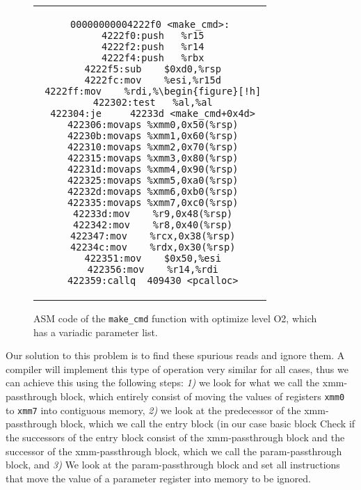 \begin{figure}[thp] %
\centering          %
\begin{tabular}{c}  %
\footnotesize
\begin{lstlisting}
00000000004222f0 <make_cmd>:
 4222f0:push   %r15
 4222f2:push   %r14
 4222f4:push   %rbx
 4222f5:sub    $0xd0,%rsp
 4222fc:mov    %esi,%r15d
 4222ff:mov    %rdi,%\begin{figure}[!h]
 422302:test   %al,%al
 422304:je     42233d <make_cmd+0x4d>
 422306:movaps %xmm0,0x50(%rsp)
 42230b:movaps %xmm1,0x60(%rsp)
 422310:movaps %xmm2,0x70(%rsp)
 422315:movaps %xmm3,0x80(%rsp)
 42231d:movaps %xmm4,0x90(%rsp)
 422325:movaps %xmm5,0xa0(%rsp)
 42232d:movaps %xmm6,0xb0(%rsp)
 422335:movaps %xmm7,0xc0(%rsp)
 42233d:mov    %r9,0x48(%rsp)
 422342:mov    %r8,0x40(%rsp)
 422347:mov    %rcx,0x38(%rsp)
 42234c:mov    %rdx,0x30(%rsp)
 422351:mov    $0x50,%esi
 422356:mov    %r14,%rdi
 422359:callq  409430 <pcalloc>
\end{lstlisting}
\end{tabular}
\caption{ASM code of the \texttt{make\_cmd} function with optimize level O2, which has a variadic parameter list.}
\label{fig:asmvariadic}
\end{figure}

Our solution to this problem is to find these spurious reads and ignore them. A compiler will implement this type of operation very 
similar for all cases, thus we can achieve this using the following steps:
\textit{1)} we look for what we call the xmm-passthrough block, which entirely consist of moving the values of registers \texttt{xmm0} to 
\texttt{xmm7} into contiguous memory, %
\textit{2)} we look at the predecessor of the xmm-passthrough block, which we call the entry block (in our case basic block %
Check if the successors of the entry block consist of the xmm-passthrough block and the successor of the 
xmm-passthrough block, which we call the param-passthrough block, and
\textit{3)} We look at the param-passthrough block and set all instructions that move the value of a parameter register into memory to be
ignored. %

